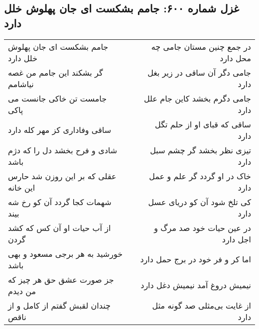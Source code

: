 \begin{center}
\section*{غزل شماره ۶۰۰: جامم بشکست ای جان پهلوش خلل دارد}
\label{sec:0600}
\begin{longtable}{l p{0.5cm} r}
جامم بشکست ای جان پهلوش خلل دارد
&&
در جمع چنین مستان جامی چه محل دارد
\\
گر بشکند این جامم من غصه نیاشامم
&&
جامی دگر آن ساقی در زیر بغل دارد
\\
جامست تن خاکی جانست می پاکی
&&
جامی دگرم بخشد کاین جام علل دارد
\\
ساقی وفاداری کز مهر کله دارد
&&
ساقی که قبای او از حلم تگل دارد
\\
شادی و فرح بخشد دل را که دژم باشد
&&
تیزی نظر بخشد گر چشم سبل دارد
\\
عقلی که بر این روزن شد حارس این خانه
&&
خاک در او گردد گر علم و عمل دارد
\\
شهمات کجا گردد آن کو رخ شه بیند
&&
کی تلخ شود آن کو دریای عسل دارد
\\
از آب حیات او آن کس که کشد گردن
&&
در عین حیات خود صد مرگ و اجل دارد
\\
خورشید به هر برجی مسعود و بهی باشد
&&
اما کر و فر خود در برج حمل دارد
\\
جز صورت عشق حق هر چیز که من دیدم
&&
نیمیش دروغ آمد نیمیش دغل دارد
\\
چندان لقبش گفتم از کامل و از ناقص
&&
از غایت بی‌مثلی صد گونه مثل دارد
\\
\end{longtable}
\end{center}
